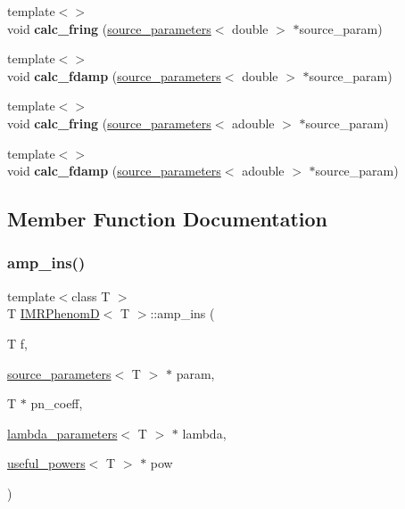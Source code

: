 \begin{DoxyCompactItemize}
\mbox{\label{classIMRPhenomD_a8fd3848d62fd8202024d66989118ced6}} 
{\footnotesize template$<$$>$ }\\void {\bfseries calc\+\_\+fring} (\hyperlink{structsource__parameters}{source\+\_\+parameters}$<$ double $>$ $\ast$source\+\_\+param)
\item 
\mbox{\label{classIMRPhenomD_a0ff9e9a2cbccaa7c8fc7b91ce9f4ce98}} 
{\footnotesize template$<$$>$ }\\void {\bfseries calc\+\_\+fdamp} (\hyperlink{structsource__parameters}{source\+\_\+parameters}$<$ double $>$ $\ast$source\+\_\+param)
\item 
\mbox{\label{classIMRPhenomD_a525e0691c320caf54ed7602407ac47ca}} 
{\footnotesize template$<$$>$ }\\void {\bfseries calc\+\_\+fring} (\hyperlink{structsource__parameters}{source\+\_\+parameters}$<$ adouble $>$ $\ast$source\+\_\+param)
\item 
\mbox{\label{classIMRPhenomD_aedf9810e29b33dc7ab01b2fbe0b85eac}} 
{\footnotesize template$<$$>$ }\\void {\bfseries calc\+\_\+fdamp} (\hyperlink{structsource__parameters}{source\+\_\+parameters}$<$ adouble $>$ $\ast$source\+\_\+param)
\end{DoxyCompactItemize}


\subsection{Member Function Documentation}
\mbox{\label{classIMRPhenomD_aef404dca66beb6652663271fee31b8f8}} 
\subsubsection{\texorpdfstring{amp\+\_\+ins()}{amp\_ins()}}
{\footnotesize\ttfamily template$<$class T $>$ \\
T \hyperlink{classIMRPhenomD}{I\+M\+R\+PhenomD}$<$ T $>$\+::amp\+\_\+ins (\begin{DoxyParamCaption}\item[{T}]{f,  }\item[{\hyperlink{structsource__parameters}{source\+\_\+parameters}$<$ T $>$ $\ast$}]{param,  }\item[{T $\ast$}]{pn\+\_\+coeff,  }\item[{\hyperlink{structlambda__parameters}{lambda\+\_\+parameters}$<$ T $>$ $\ast$}]{lambda,  }\item[{\hyperlink{structuseful__powers}{useful\+\_\+powers}$<$ T $>$ $\ast$}]{pow }\end{DoxyParamCaption})\hspace{0.3cm}{\ttfamily [virtual]}}



